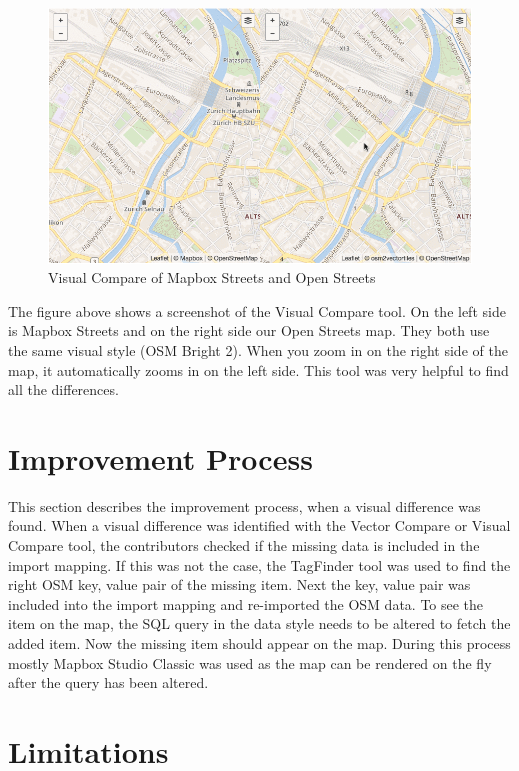 \begin{figure}[H]
\centering
  \includegraphics[width=1\textwidth]{images/visual_compare.png}
  \caption{Visual Compare of Mapbox Streets and Open Streets}
\end{figure}

The figure above shows a screenshot of the Visual Compare tool. On the left side is Mapbox Streets and on the right side our Open Streets map. They both use the same visual style (OSM Bright 2\cite{92_github_2015}). When you zoom in on the right side of the map, it automatically zooms in on the left side. This tool was very helpful to find all the differences.

\section{Improvement Process}

This section describes the improvement process, when a visual difference was found. When a visual difference was identified with the Vector Compare or Visual Compare tool, the contributors checked if the missing data is included in the import mapping. If this was not the case, the TagFinder tool\cite{93_wiki.openstreetmap.org_2015} was used to find the right OSM key, value pair of the missing item. Next the key, value pair was included into the import mapping and re-imported the OSM data. To see the item on the map, the SQL query in the data style needs to be altered to fetch the added item. Now the missing item should appear on the map. During this process mostly Mapbox Studio Classic\cite{mapbox_studio_classic} was used as the map can be rendered on the fly after the query has been altered.

\section{Limitations}\label{project_limitations}

